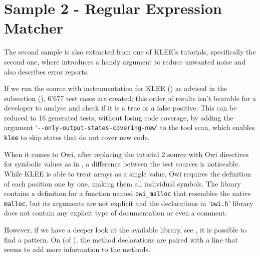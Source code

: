 \section{Sample 2 - Regular Expression Matcher}\label{section:sample_2}

The second sample is also extracted from one of KLEE's tutorials, specifically the second one, where \citeauthor{klee_tutorial2} introduces a handy argument to reduce unwanted noise and also describes error reports.

If we run the source with instrumentation for KLEE () as advised in the  subsection (), 6'677 test cases are created; this order of results isn't bearable for a developer to analyse and check if it is a true or a false positive. This can be reduced to 16 generated tests, without losing code coverage, by adding the argument `\lstinline$--only-output-states-covering-new$' to the tool scan, which enables \lstinline$klee$ to skip states that do not cover new code.

When it comes to Owi, after replacing the tutorial 2 source with Owi directives for symbolic values as in , a difference between the test sources is noticeable. While KLEE is able to treat arrays as a single value, Owi requires the definition of each position one by one, making them all individual symbols. The library contains a definition for a function named \lstinline$owi_malloc$ that resembles the native \lstinline$malloc$, but its arguments are not explicit and the declarations in `\lstinline$owi.h$' library does not contain any explicit type of documentation or even a comment. 

However, if we have a deeper look at the available library, see , it is possible to find a pattern. On  (of ), the method declarations are paired with a line that seems to add more information to the methods. 


